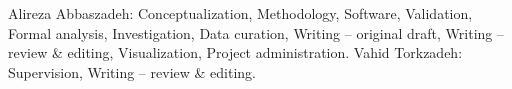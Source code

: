 Alireza Abbaszadeh: Conceptualization, Methodology, Software, Validation, Formal analysis, Investigation, Data curation, Writing -- original draft, Writing -- review \& editing, Visualization, Project administration.
Vahid Torkzadeh: Supervision, Writing -- review \& editing.

